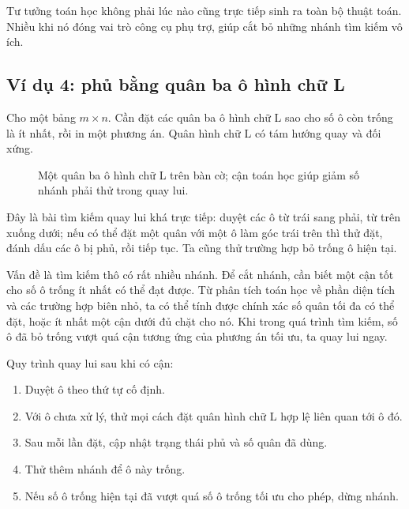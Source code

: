\documentclass[11pt]{article}
\begin{document}
Tư tưởng toán học không phải lúc nào cũng trực tiếp sinh ra toàn bộ thuật
toán. Nhiều khi nó đóng vai trò công cụ phụ trợ, giúp cắt bỏ những nhánh tìm
kiếm vô ích.

\subsection{Ví dụ 4: phủ bằng quân ba ô hình chữ L}

Cho một bảng \(m\times n\). Cần đặt các quân ba ô hình chữ L sao cho số ô còn
trống là ít nhất, rồi in một phương án. Quân hình chữ L có tám hướng quay và
đối xứng.

\begin{figure}[ht]
\centering
{}
\caption{Một quân ba ô hình chữ L trên bàn cờ; cận toán học giúp giảm số
nhánh phải thử trong quay lui.}
\end{figure}

Đây là bài tìm kiếm quay lui khá trực tiếp: duyệt các ô từ trái sang phải,
từ trên xuống dưới; nếu có thể đặt một quân với một ô làm góc trái trên thì
thử đặt, đánh dấu các ô bị phủ, rồi tiếp tục. Ta cũng thử trường hợp bỏ trống
ô hiện tại.

Vấn đề là tìm kiếm thô có rất nhiều nhánh. Để cắt nhánh, cần biết một cận tốt
cho số ô trống ít nhất có thể đạt được. Từ phân tích toán học về phần diện
tích và các trường hợp biên nhỏ, ta có thể tính được chính xác số quân tối đa
có thể đặt, hoặc ít nhất một cận dưới đủ chặt cho nó. Khi trong quá trình tìm
kiếm, số ô đã bỏ trống vượt quá cận tương ứng của phương án tối ưu, ta quay
lui ngay.

Quy trình quay lui sau khi có cận:

\begin{enumerate}
  \item Duyệt ô theo thứ tự cố định.
  \item Với ô chưa xử lý, thử mọi cách đặt quân hình chữ L hợp lệ liên quan
  tới ô đó.
  \item Sau mỗi lần đặt, cập nhật trạng thái phủ và số quân đã dùng.
  \item Thử thêm nhánh để ô này trống.
  \item Nếu số ô trống hiện tại đã vượt quá số ô trống tối ưu cho phép, dừng
  nhánh.
\end{enumerate}
\end{document}
